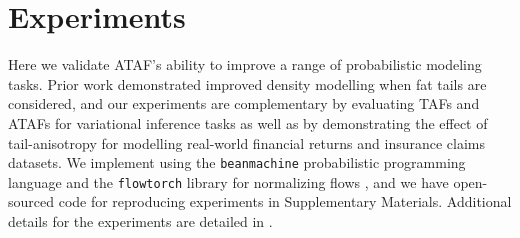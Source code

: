 \documentclass[nohyperref]{article}
\theoremstyle{plain}
\theoremstyle{definition}
\theoremstyle{remark}
\begin{document}

\vspace{-2mm}
\section{Experiments}
\label{sec:experiments}

\vspace{-1mm}
Here we validate ATAF's ability to improve
a range of probabilistic modeling tasks.
Prior work \citep{jaini2020tails} demonstrated improved
density modelling when fat tails are considered, and
our experiments are complementary by evaluating TAFs and ATAFs for variational inference tasks as well as by demonstrating the effect of tail-anisotropy for modelling real-world financial returns and insurance claims datasets.
We implement using the 
\texttt{beanmachine} probabilistic programming language \citep{tehrani2020bean}
and the
\texttt{flowtorch} library for normalizing flows \citep{flowtorchai},
and we have open-sourced code for reproducing experiments in Supplementary Materials. 
Additional details for the experiments are detailed in .

\end{document}
